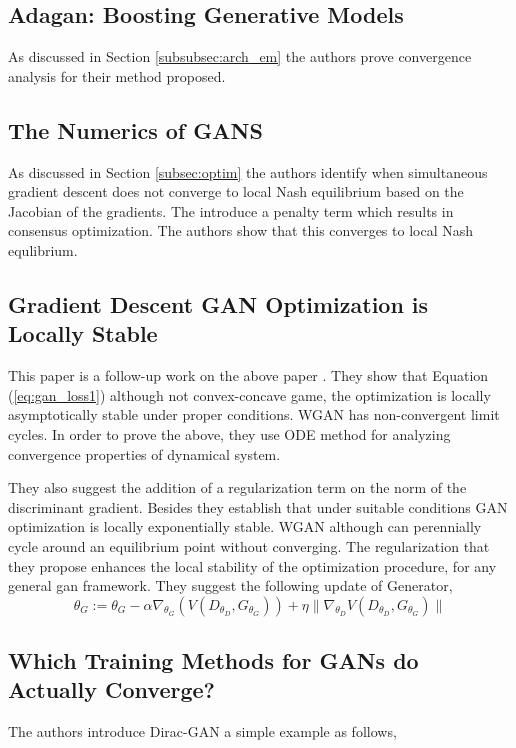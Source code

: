 \subsection*{Adagan: Boosting Generative Models \citep{adagan}} As discussed in Section \ref{subsubsec:arch_em} the authors prove convergence analysis for their method proposed. 
 
\subsection*{The Numerics of GANS \citep{geiger06}}
As discussed in Section \ref{subsec:optim} the authors identify when simultaneous gradient descent does not converge to local Nash equilibrium based on the Jacobian of the gradients. The introduce a penalty term which results in consensus optimization. The authors show that this converges to local Nash equlibrium.

\subsection*{Gradient Descent GAN Optimization is Locally Stable  \citep{CMU17}}
This paper is a follow-up work on the above paper \citep{geiger06}. 
They show that Equation (\ref{eq:gan_loss1}) although not convex-concave game, the optimization is locally asymptotically stable under proper conditions. WGAN has non-convergent limit cycles. In order to prove the above, they use ODE method for analyzing convergence properties of dynamical system. 

They also suggest the addition of a regularization term on the norm of the discriminant gradient. Besides they establish that under suitable conditions GAN optimization is locally exponentially stable.  WGAN although can perennially cycle around an equilibrium point without converging. The regularization that they propose enhances the local stability of the optimization procedure, for any general gan framework.
They suggest the following update of Generator,
$$\theta_{G} := \theta_{G} - \alpha \nabla_{\theta_{G}} (V(D_{\theta_{D}}, G_{\theta_{G}})) + \eta \parallel \nabla_{\theta_{D}} V(D_{\theta_{D}}, G_{\theta_{G}}) \parallel $$

\subsection*{Which Training Methods for GANs do Actually Converge? \citep{mescheder18icml}}
The authors introduce Dirac-GAN a simple example as follows,

